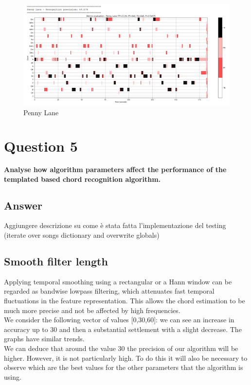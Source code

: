 \documentclass[
	12pt, %
]{fphw}
\begin{document}
\begin{figure}[H]
 \centering
 \includegraphics[scale=1]{./images/4_penny_lane_metrics.png}
 \caption{Penny Lane}
\end{figure}


\section*{\color{red}Question 5}

\begin{problem}
	\textbf{Analyse how algorithm parameters affect the performance of the templated based chord recognition algorithm.}
\end{problem}

\subsection*{\color{blue}Answer}

\color{red}Aggiungere descrizione su come è stata fatta l'implementazione del testing (iterate over songs dictionary and overwrite globals)\color{black}

\subsection*{Smooth filter length} 

Applying temporal smoothing using a rectangular or a Hann window can be regarded as bandwise lowpass filtering, which attenuates fast temporal fluctuations in the feature representation. This allows the chord estimation to be much more precise and not be affected by high frequencies. \\
We consider the following vector of values [0,30,60]: we can see an increase in accuracy up to 30 and then a substantial settlement with a slight decrease. The graphs have similar trends.\\
We can deduce that around the value 30 the precision of our algorithm will be higher. However, it is not particularly high. To do this it will also be necessary to observe which are the best values for the other parameters that the algorithm is using. \\
\end{document}
